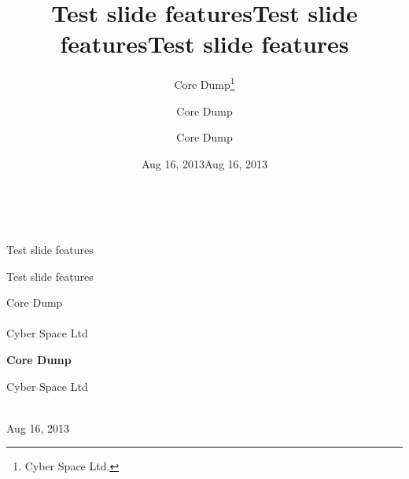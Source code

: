 \documentclass[%
oneside,                 %
final,                   %
chapterprefix=true,      %
open=right               %
10pt]{book}
\begin{document}







\title{Test slide features}


\thispagestyle{empty}
\hbox{\ \ }
\vfill
\begin{center}
{\huge{\bfseries{
\begin{spacing}{1.25}
Test slide features
\end{spacing}
}}}

\title*{Test slide features}

\title{Test slide features}
\begin{center}
{\LARGE\bf
\begin{spacing}{1.25}
Test slide features
\end{spacing}
}
\end{center}

\author{Core Dump\footnote{Cyber Space Ltd.}}

\vspace{1.3cm}

{\Large\textsf{Core Dump}}\\ [3mm]

\ \\ [2mm]

{\large\textsf{Cyber Space Ltd} \\ [1.5mm]}

\author{Core Dump}

\author{Core Dump}

\begin{center}
{\bf Core Dump}
\end{center}

\begin{center}
\centerline{{\small Cyber Space Ltd}}
\end{center}


\date{Aug 16, 2013}
\maketitle
\date{Aug 16, 2013
}

\ \\ [10mm]
{\large\textsf{Aug 16, 2013}}

\end{center}
\end{document}
